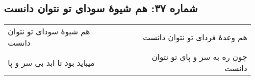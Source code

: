 \begin{center}
\section*{شماره ۳۷: هم شیوۀ سودای تو نتوان دانست}
\label{sec:037}
\begin{longtable}{l p{0.5cm} r}
هم شیوهٔ سودای تو نتوان دانست
&&
هم وعدهٔ فردای تو نتوان دانست
\\
میباید بود تا ابد بی سر و پا
&&
چون ره به سر و پای تو نتوان دانست
\\
\end{longtable}
\end{center}
